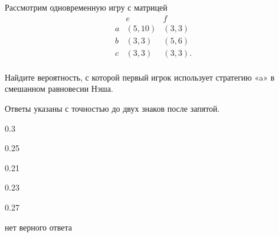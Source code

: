 
\begin{question}
Рассмотрим одновременную игру с матрицей \[
\begin{matrix}
   & e & f \\
a  & (5, 10) & (3, 3) \\
b  & (3, 3) & (5, 6) \\
c  & (3, 3) & (3, 3). \\
\end{matrix}
\]

Найдите вероятность, с которой первый игрок использует стратегию «a» в
смешанном равновесии Нэша.

Ответы указаны с точностью до двух знаков после запятой.
\begin{answerlist}
  \item 0.3
  \item 0.25
  \item 0.21
  \item 0.23
  \item 0.27
  \item нет верного ответа
\end{answerlist}
\end{question}


